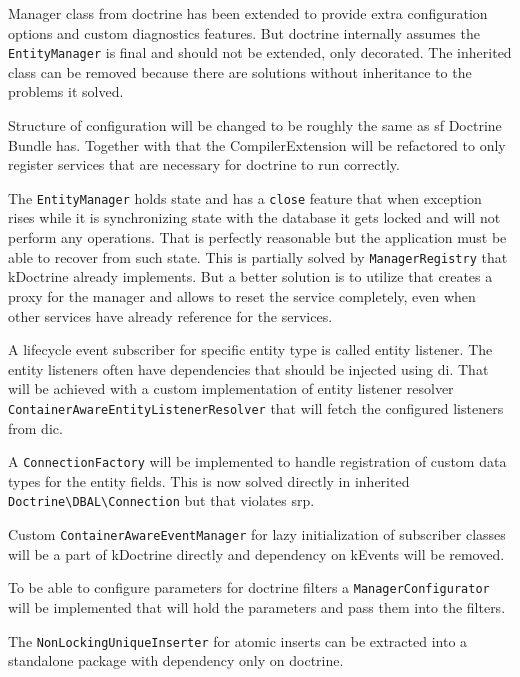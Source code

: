 Manager class from \gls{doctrine} has been extended to provide extra configuration options and custom diagnostics features. But \gls{doctrine} internally assumes the \lstinline{EntityManager} is final and should not be extended, only decorated. The inherited class can be removed because there are solutions without inheritance to the problems it solved.

Structure of configuration will be changed to be roughly the same as \gls{sf} Doctrine Bundle has. Together with that the CompilerExtension will be refactored to only register services that are necessary for \gls{doctrine} to run correctly.

The \lstinline{EntityManager} holds state and has a \lstinline{close} feature that when exception rises while it is synchronizing state with the database it gets locked and will not perform any operations. That is perfectly reasonable but the application must be able to recover from such state. This is partially solved by \lstinline{ManagerRegistry} that \gls{kDoctrine} already implements. But a better solution is to utilize  that creates a proxy for the manager and allows to reset the service completely, even when other services have already reference for the services.

A lifecycle event subscriber for specific entity type is called entity listener. The entity listeners often have dependencies that should be injected using \gls{di}. That will be achieved with a custom implementation of entity listener resolver \lstinline{ContainerAwareEntityListenerResolver} that will fetch the configured listeners from \gls{dic}.

A \lstinline{ConnectionFactory} will be implemented to handle registration of custom data types for the entity fields. This is now solved directly in inherited \lstinline{Doctrine\DBAL\Connection} but that violates \gls{srp}.

Custom \lstinline{ContainerAwareEventManager} for lazy initialization of subscriber classes will be a part of \gls{kDoctrine} directly and dependency on \gls{kEvents} will be removed.

To be able to configure parameters for \gls{doctrine} filters a \lstinline{ManagerConfigurator} will be implemented that will hold the parameters and pass them into the filters.

The \lstinline{NonLockingUniqueInserter} for atomic inserts can be extracted into a standalone package with dependency only on \gls{doctrine.}

